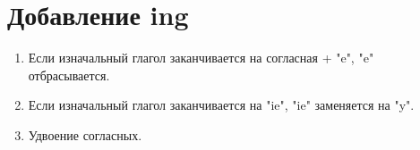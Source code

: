 \documentclass[oneside]{book}
\begin{document}
	\section{Добавление ing}
	\begin{enumerate}
		\item Если изначальный глагол заканчивается на согласная + "e"{}, "e" отбрасывается.
		\item Если изначальный глагол заканчивается на "ie"{}, "ie" заменяется на "y".
		\item Удвоение согласных.
	\end{enumerate}
\end{document}
